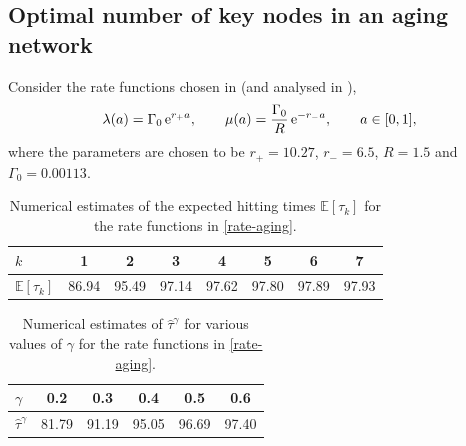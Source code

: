 \documentclass[11pt]{article}
\numberwithin{equation}{section}
\newcommand{\eee}{{\rm e}}
\begin{document}

\subsection{Optimal number of key nodes in an aging network}
\label{ss.optag}

Consider the rate functions chosen in \cite{MRFR2017} (and analysed in \cite{Aging}),
\begin{equation}
\label{rate-aging}
\lambda(a) = \Gamma_0\,\eee^{r_+ a},  \qquad \mu(a) = \frac{\Gamma_0}{R} \,\eee^{-r_- a}, \qquad a \in [0,1],
\end{equation}
where the parameters are chosen to be $r_+ = 10.27$, $r_- = 6.5$, $R = 1.5$ and $\Gamma_0 = 0.00113$.

\setlength{\tabcolsep}{8pt}
\begin{table}[htbp]
\caption{Numerical estimates of the expected hitting times $\mathbb{E}[\tau_k]$ for the rate functions in \eqref{rate-aging}.}
\vspace*{-3mm}
\label{tab:etauk}
\centering
\small
\renewcommand{\arraystretch}{1.5}
\begin{tabular}{lccccccc}
\toprule
\textbf{$k$} & 1 & 2 & 3 & 4 & 5 & 6 & 7 \\
\midrule
\textbf{$\mathbb{E}[\tau_k]$} & 86.94 & 95.49 & 97.14 & 97.62 & 97.80 & 97.89 & 97.93 \\
\bottomrule
\end{tabular}
\end{table}


\setlength{\tabcolsep}{8pt}
\begin{table}[htbp]
\caption{Numerical estimates of $\hat{\tau}^{\gamma}$ for various values of $\gamma$ for the rate functions in \eqref{rate-aging}.}
\vspace*{-3mm}
\label{tab:taualpha}
\centering
\small
\renewcommand{\arraystretch}{1.5}
\begin{tabular}{lccccc}
\toprule
\textbf{$\gamma$} & 0.2 & 0.3 & 0.4 & 0.5 & 0.6 \\
\midrule
\textbf{$\hat{\tau}^{\gamma}$} & 81.79 & 91.19 & 95.05 & 96.69 & 97.40 \\
\bottomrule
\end{tabular}
\end{table}
\end{document}
